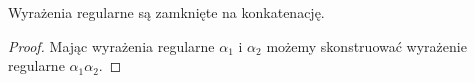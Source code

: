 \begin{theorem}
	Wyrażenia regularne są zamknięte na konkatenację.
\end{theorem}

\begin{proof}
	Mając wyrażenia regularne \(\alpha_1\) i \(\alpha_2\) możemy skonstruować wyrażenie regularne \( \alpha_1 \alpha_2 \).
\end{proof}
